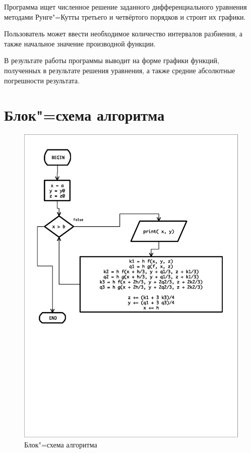 \documentclass[a4paper,12pt,notitlepage,headsepline,pdftex]{scrartcl}
\begin{document}
  Программа ищет численное решение заданного дифференциального уравнения
  методами Рунге"=Кутты третьего и четвёртого порядков и строит их графики.

  Пользователь может ввести необходимое количество интервалов разбиения, а
  также начальное значение производной функции.

  В результате работы программы выводит на форме графики функций, полученных в
  результате решения уравнения, а также средние абсолютные погрешности
  результата.
  \newpage
\section{Блок"=схема алгоритма}
  \begin{figure}[h!]
    \begin{center}
      \includegraphics[scale=0.60]{flowchart.eps}
    \end{center}
    \caption{Блок"=схема алгоритма}
    \label{fig:flowchart}
  \end{figure}
  \newpage
\end{document}
